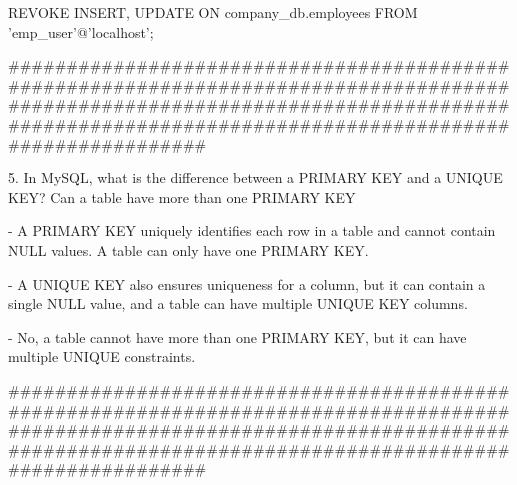   REVOKE INSERT, UPDATE ON company_db.employees FROM 'emp_user'@'localhost';

#############################################################################################################################################################################################

5. In MySQL, what is the difference between a PRIMARY KEY and a UNIQUE KEY? Can a table have more than one PRIMARY KEY

- A PRIMARY KEY uniquely identifies each row in a table and cannot contain NULL values. A table can only have one PRIMARY KEY.

- A UNIQUE KEY also ensures uniqueness for a column, but it can contain a single NULL value, and a table can have multiple UNIQUE KEY columns.

- No, a table cannot have more than one PRIMARY KEY, but it can have multiple UNIQUE constraints.

#############################################################################################################################################################################################


